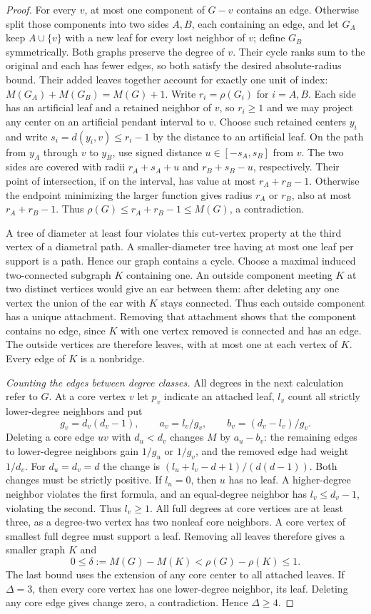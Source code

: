 \documentclass[11pt,a4paper]{article}
\theoremstyle{remark}\newtheorem{remark}[theorem]{Remark}
\begin{document}
\begin{proof}
For every $v$, at most one component of $G-v$ contains an edge.
Otherwise split those components into two sides $A,B$, each containing
an edge, and let $G_A$ keep $A\cup\{v\}$ with a new leaf for every
lost neighbor of $v$; define $G_B$ symmetrically. Both graphs preserve
the degree of $v$. Their cycle ranks sum to the original and each
has fewer edges, so both satisfy the desired absolute-radius bound.
Their added leaves together account for exactly one unit of index:
$M(G_A)+M(G_B)=M(G)+1$. Write $r_i=\rho(G_i)$ for $i=A,B$.
Each side has an artificial leaf and a retained neighbor of $v$, so
$r_i\ge1$ and we may project any center on an artificial pendant
interval to $v$. Choose such retained centers $y_i$ and write
$s_i=d(y_i,v)\le r_i-1$ by the distance to an artificial leaf.
On the path from $y_A$ through $v$ to $y_B$, use signed distance
$u\in[-s_A,s_B]$ from $v$. The two sides are covered with radii
$r_A+s_A+u$ and $r_B+s_B-u$, respectively. Their point of intersection,
if on the interval, has value at most $r_A+r_B-1$.
Otherwise the endpoint minimizing the larger function gives radius
$r_A$ or $r_B$, also at most $r_A+r_B-1$. Thus
$\rho(G)\le r_A+r_B-1\le M(G)$, a contradiction.

A tree of diameter at least four violates this cut-vertex property at
the third vertex of a diametral path. A smaller-diameter tree having
at most one leaf per support is a path. Hence our graph contains a
cycle. Choose a maximal induced two-connected subgraph $K$ containing
one. An outside component meeting $K$ at two distinct vertices would
give an ear between them: after deleting any one vertex the union of
the ear with $K$ stays connected. Thus each outside component has a
unique attachment. Removing that attachment shows that the component
contains no edge, since $K$ with one vertex removed is connected and
has an edge. The outside vertices are therefore leaves, with at most
one at each vertex of $K$. Every edge of $K$ is a nonbridge.

\emph{Counting the edges between degree classes.} All degrees in the
next calculation refer to $G$. At a core vertex $v$ let $p_v$ indicate an
attached leaf, $l_v$ count all strictly lower-degree neighbors and put
\[
 g_v=d_v(d_v-1),\qquad
 a_v=l_v/g_v,\qquad b_v=(d_v-l_v)/g_v .
\]
Deleting a core edge $uv$ with $d_u<d_v$ changes $M$ by $a_u-b_v$:
the remaining edges to lower-degree neighbors gain $1/g_u$ or $1/g_v$,
and the removed edge had weight $1/d_v$. For $d_u=d_v=d$ the change is
$(l_u+l_v-d+1)/(d(d-1))$. Both changes must be strictly positive.
If $l_u=0$, then $u$ has no leaf. A higher-degree neighbor violates the
first formula, and an equal-degree neighbor has $l_v\le d_v-1$,
violating the second. Thus $l_v\ge1$. All full degrees at core vertices are at least
three, as a degree-two vertex has two nonleaf core neighbors. A core
vertex of smallest full degree must support a leaf. Removing all leaves
therefore gives a smaller graph $K$ and
\[
 0\le\delta:=M(G)-M(K)<\rho(G)-\rho(K)\le1 .
\]
The last bound uses the extension of any core center to all attached
leaves. If $\Delta=3$, then every core vertex has one lower-degree
neighbor, its leaf. Deleting any core edge gives change zero, a
contradiction. Hence $\Delta\ge4$.


\end{proof}
\end{document}
